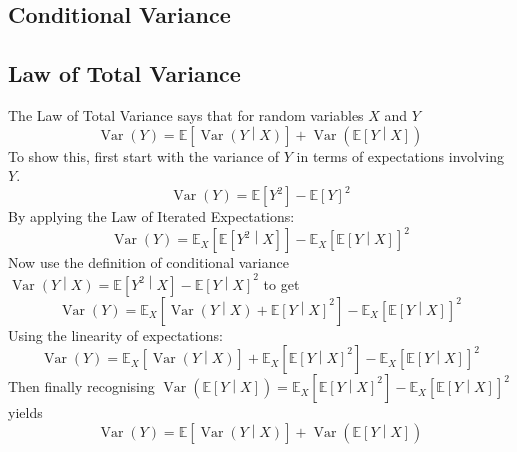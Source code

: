 \documentclass[11pt]{report} %
\begin{document}
\subsection{Conditional Variance}

\subsection{Law of Total Variance}

The Law of Total Variance says that for random variables $X$ and $Y$
\begin{equation}
\operatorname{Var}\left(Y\right) = \mathbb{E}\left[\operatorname{Var}\left(Y\middle|X\right)\right] + \operatorname{Var}\left(\mathbb{E}\left[Y\middle|X\right]\right)
\end{equation}
To show this, first start with the variance of $Y$ in terms of expectations involving $Y$.
\begin{equation}
\operatorname{Var}\left(Y\right) = \mathbb{E}\left[Y^{2}\right] - \mathbb{E}\left[Y\right]^{2}
\end{equation}
By applying the Law of Iterated Expectations:
\begin{equation}
\operatorname{Var}\left(Y\right) = \mathbb{E}_{X}\left[\mathbb{E}\left[Y^{2}\middle|X\right]\right] - \mathbb{E}_{X}\left[\mathbb{E}\left[Y\middle|X\right]\right]^{2}
\end{equation}
Now use the definition of conditional variance $\operatorname{Var}\left(Y\middle|X\right) = \mathbb{E}\left[Y^{2}\middle|X\right] - \mathbb{E}\left[Y\middle|X\right]^{2}$ to get
\begin{equation}
\operatorname{Var}\left(Y\right) = \mathbb{E}_{X}\left[\operatorname{Var}\left(Y\middle|X\right) + \mathbb{E}\left[Y\middle|X\right]^{2}\right] - \mathbb{E}_{X}\left[\mathbb{E}\left[Y\middle|X\right]\right]^{2}
\end{equation}
Using the linearity of expectations:
\begin{equation}
\operatorname{Var}\left(Y\right) = \mathbb{E}_{X}\left[\operatorname{Var}\left(Y\middle|X\right)\right] + \mathbb{E}_{X}\left[\mathbb{E}\left[Y\middle|X\right]^{2}\right] - \mathbb{E}_{X}\left[\mathbb{E}\left[Y\middle|X\right]\right]^{2}
\end{equation}
Then finally recognising $\operatorname{Var}\left(\mathbb{E}\left[Y\middle|X\right]\right) = \mathbb{E}_{X}\left[\mathbb{E}\left[Y\middle|X\right]^{2}\right] - \mathbb{E}_{X}\left[\mathbb{E}\left[Y\middle|X\right]\right]^{2}$ yields
\begin{equation}
\operatorname{Var}\left(Y\right) = \mathbb{E}\left[\operatorname{Var}\left(Y\middle|X\right)\right] + \operatorname{Var}\left(\mathbb{E}\left[Y\middle|X\right]\right)
\end{equation}
\end{document}
